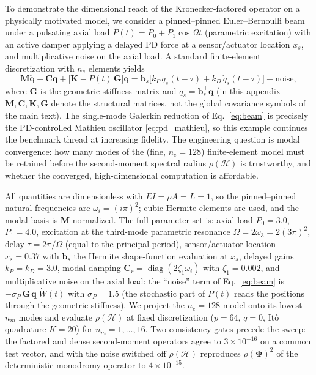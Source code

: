 \documentclass[preprint,12pt]{elsarticle}
\begin{document}
To demonstrate the dimensional reach of the Kronecker-factored operator on a physically motivated model, we consider a pinned--pinned Euler--Bernoulli beam under a pulsating axial load $P(t) = P_0 + P_1 \cos \Omega t$ (parametric excitation) with an active damper applying a delayed PD force at a sensor/actuator location $x_s$, and multiplicative noise on the axial load. A standard finite-element discretization with $n_e$ elements yields
\begin{equation}
\label{eq:beam}
\mathbf{M}\ddot{\mathbf q} + \mathbf{C}\dot{\mathbf q} + \big[\mathbf{K} - P(t)\, \mathbf{G}\big] \mathbf q
= \mathbf{b}_s \big[ k_P\, q_s(t-\tau) + k_D\, \dot q_s(t-\tau) \big]
+ \text{noise},
\end{equation}
where $\mathbf{G}$ is the geometric stiffness matrix and $q_s = \mathbf{b}_s^\top \mathbf{q}$ (in this appendix $\mathbf{M}, \mathbf{C}, \mathbf{K}, \mathbf{G}$ denote the structural matrices, not the global covariance symbols of the main text). The single-mode Galerkin reduction of Eq.~\eqref{eq:beam} is precisely the PD-controlled Mathieu oscillator \eqref{eq:pd_mathieu}, so this example continues the benchmark thread at increasing fidelity. The engineering question is modal convergence: how many modes of the (fine, $n_e=128$) finite-element model must be retained before the second-moment spectral radius $\rho(\mathcal{H})$ is trustworthy, and whether the converged, high-dimensional computation is affordable.

All quantities are dimensionless with $EI = \rho A = L = 1$, so the pinned--pinned natural frequencies are $\omega_i = (i\pi)^2$; cubic Hermite elements are used, and the modal basis is $\mathbf{M}$-normalized. The full parameter set is: axial load $P_0 = 3.0$, $P_1 = 4.0$, excitation at the third-mode parametric resonance $\Omega = 2\omega_3 = 2(3\pi)^2$, delay $\tau = 2\pi/\Omega$ (equal to the principal period), sensor/actuator location $x_s = 0.37$ with $\mathbf{b}_s$ the Hermite shape-function evaluation at $x_s$, delayed gains $k_P = k_D = 3.0$, modal damping $\mathbf{C}_r = \operatorname{diag}(2\zeta_1\omega_i)$ with $\zeta_1 = 0.002$, and multiplicative noise on the axial load: the ``noise'' term of Eq.~\eqref{eq:beam} is $-\sigma_P\,\mathbf{G}\,\mathbf{q}\;\dot W(t)$ with $\sigma_P = 1.5$ (the stochastic part of $P(t)$ reads the positions through the geometric stiffness). We project the $n_e = 128$ model onto its lowest $n_m$ modes and evaluate $\rho(\mathcal{H})$ at fixed discretization ($p = 64$, $q = 0$, It\^o quadrature $K = 20$) for $n_m = 1,\dots,16$. Two consistency gates precede the sweep: the factored and dense second-moment operators agree to $3\times10^{-16}$ on a common test vector, and with the noise switched off $\rho(\mathcal{H})$ reproduces $\rho(\boldsymbol{\Phi})^2$ of the deterministic monodromy operator to $4\times10^{-15}$.
\end{document}
